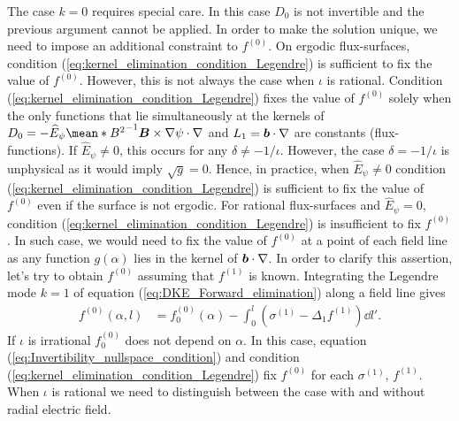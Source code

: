 \documentclass[10pt]{iopart}
\begin{document}
The case $k=0$ requires special care. In this case $D_0$ is not invertible and the previous argument cannot be applied. In order to make the solution unique, we need to impose an additional constraint to $f^{(0)}$. On ergodic flux-surfaces, condition (\ref{eq:kernel_elimination_condition_Legendre}) is sufficient to fix the value of $f^{(0)}$. However, this is not always the case when $\iota$ is rational. Condition (\ref{eq:kernel_elimination_condition_Legendre}) fixes the value of $f^{(0)}$ solely when the only functions that lie simultaneously at the kernels of $D_0 = -\widehat{E}_\psi \mean*{B^2}^{-1} \vb*{B}\times\nabla\psi\cdot\nabla$ and $L_1=\vb*{b}\cdot\nabla$ are constants (flux-functions). If $\widehat{E}_\psi \ne 0$, this occurs for any $\delta\ne -1/\iota $. However, the case $\delta= -1/\iota$ is unphysical as it would imply $\sqrt{g}=0$. Hence, in practice, when $\widehat{E}_\psi \ne 0$ condition (\ref{eq:kernel_elimination_condition_Legendre}) is sufficient to fix the value of $f^{(0)}$ even if the surface is not ergodic. For rational flux-surfaces and $\widehat{E}_\psi = 0$, condition (\ref{eq:kernel_elimination_condition_Legendre}) is insufficient to fix $f^{(0)}$. In such case, we would need to fix the value of $f^{(0)}$ at a point of each field line as any function $g(\alpha)$ lies in the kernel of $\vb*{b}\cdot\nabla$. In order to clarify this assertion, let's try to obtain $f^{(0)}$ assuming that $f^{(1)}$ is known. Integrating the Legendre mode $k=1$ of equation (\ref{eq:DKE_Forward_elimination}) along a field line gives
%
\begin{align}
	f^{(0)}(\alpha,l)
	& =
	f^{(0)}_0(\alpha)
	\label{eq:Invertibility_nullspace_condition}
	-
	\int_{0}^{l}
	\left(
	\sigma^{(1)}
	- \Delta_1 f^{(1)} 
	\right)\dd{l'}.
\end{align} 
If $\iota$ is irrational $f_0^{(0)}$ does not depend on $\alpha$. In this case, equation (\ref{eq:Invertibility_nullspace_condition}) and condition (\ref{eq:kernel_elimination_condition_Legendre}) fix $f^{(0)}$ for each $\sigma^{(1)}$, $f^{(1)}$. When $\iota$ is rational we need to distinguish between the case with and without radial electric field. 
\end{document}
